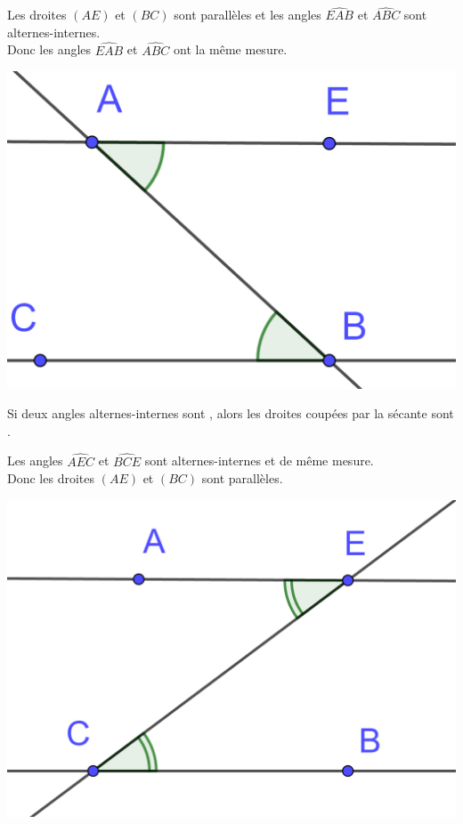 \documentclass[12pt,a4paper]{article}
\begin{document}
\begin{myex}
	
	
	\begin{multicols}{2}
		Les droites $(AE)$ et $(BC)$ sont parallèles et les angles $\widehat{EAB}$ et $\widehat{ABC}$ sont alternes-internes. \\
		
		Donc les angles $\widehat{EAB}$ et $\widehat{ABC}$ ont la même mesure.
		
		\begin{center}
			\includegraphics[scale=0.15]{alt_int2}
		\end{center}
	\end{multicols}
\end{myex}


\begin{myprop}
	Si deux angles alternes-internes sont , alors les droites coupées par la sécante sont .
\end{myprop}

\begin{myex}
	\begin{multicols}{2}
		
		Les angles $\widehat{AEC}$ et $\widehat{BCE}$ sont alternes-internes et de même mesure. \\
		
		Donc les droites $(AE)$ et $(BC)$ sont parallèles.
		
		\begin{center}
			\includegraphics[scale=0.15]{alt_int3}
		\end{center}
	\end{multicols}
\end{myex}
\end{document}
